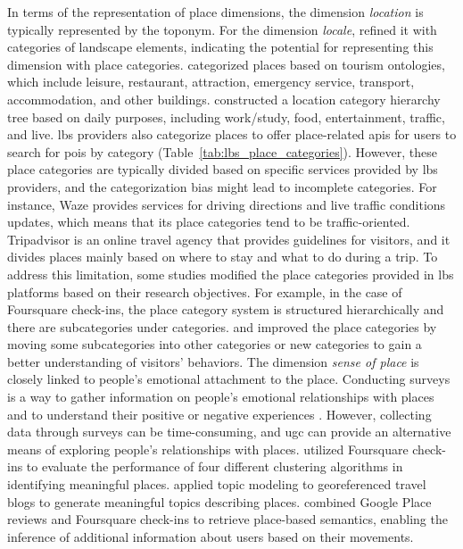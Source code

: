 \documentclass{article}
\theoremstyle{remark}
\begin{document}
In terms of the representation of place dimensions, the dimension \textit{location} is typically represented by the toponym. For the dimension \textit{locale}, 
\cite{wartmann_describing_2018} refined it with categories of landscape elements, indicating the potential for representing this dimension with place categories. \cite{koirala_social_2015} categorized places based on tourism ontologies, which include leisure, restaurant, attraction, emergency service, transport, accommodation, and other buildings. \cite{liu_stccd_2020} constructed a location category hierarchy tree based on daily purposes, including work/study, food, entertainment, traffic, and live. \acrfull{lbs} providers also categorize places to offer place-related \acrshort{api}s for users to search for \acrshort{poi}s by category (Table~\ref{tab:lbs_place_categories}). However, these place categories are typically divided based on specific services provided by \acrshort{lbs} providers, and the categorization bias might lead to incomplete categories. For instance, Waze provides services for driving directions and live traffic conditions updates, which means that its place categories tend to be traffic-oriented. Tripadvisor is an online travel agency that provides guidelines for visitors, and it divides places mainly based on where to stay and what to do during a trip. To address this limitation, some studies modified the place categories provided in \acrshort{lbs} platforms based on their research objectives. For example, in the case of Foursquare check-ins, the place category system is structured hierarchically and there are subcategories under categories. \cite{ferreira_uncovering_2020} and \cite{yang_identifying_2021} improved the place categories by moving some subcategories into other categories or new categories to gain a better understanding of visitors' behaviors. The dimension \textit{sense of place} is closely linked to people's emotional attachment to the place. Conducting surveys is a way to gather information on people's emotional relationships with places and to understand their positive or negative experiences \citep{manzo_for_2005}. However, collecting data through surveys can be time-consuming, and \acrshort{ugc} can provide an alternative means of exploring people's relationships with places. \cite{wang_using_2015} utilized Foursquare check-ins to evaluate the performance of four different clustering algorithms in identifying meaningful places. \cite{sui_inferring_2013} applied topic modeling to georeferenced travel blogs to generate meaningful topics describing places. \cite{hallot_who_2015} combined Google Place reviews and Foursquare check-ins to retrieve place-based semantics, enabling the inference of additional information about users based on their movements.
\end{document}

